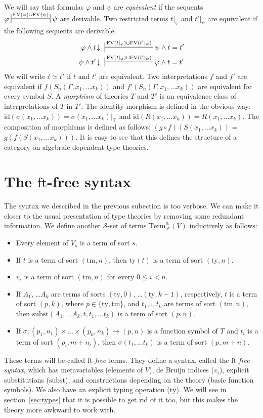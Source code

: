 \documentclass[reqno]{amsart}
\theoremstyle{definition}
\theoremstyle{remark}
\newcommand{\fs}[1]{\mathrm{#1}}
\newcommand{\Term}{\fs{Term}}
\newcommand{\FV}{\fs{FV}}
\newcommand{\subst}{\fs{subst}}
\newcommand{\ft}{\fs{ft}}
\newcommand{\ty}{\fs{ty}}
\newcommand{\tm}{\fs{tm}}
\newcommand{\id}{\fs{id}}
\numberwithin{figure}{section}
\begin{document}
We will say that formulas $\varphi$ and $\psi$ are \emph{equivalent} if the sequents $\varphi \ssststile{}{\FV(\varphi) \cup \FV(\psi)} \psi$ are derivable.
Two restricted terms $t|_\varphi$ and $t'|_\psi$ are equivalent if the following sequents are derivable:
\begin{align*}
\varphi \land t\!\downarrow\ & \sststile{}{\FV(t|_\varphi) \cup \FV(t'|_\psi)} \psi \land t = t' \\
\psi \land t'\!\downarrow\ & \sststile{}{\FV(t|_\varphi) \cup \FV(t'|_\psi)} \varphi \land t = t'
\end{align*}
We will write $t \simeq t'$ if $t$ and $t'$ are equivalent.
Two interpretations $f$ and $f'$ are equivalent if $f(S_n(\Gamma, x_1, \ldots x_k))$ and $f'(S_n(\Gamma, x_1, \ldots x_k))$ are equivalent for every symbol $S$.
A \emph{morphism} of theories $T$ and $T'$ is an equivalence class of interpretations of $T$ in $T'$.
The identity morphism is defined in the obvious way: $\id(\sigma(x_1, \ldots x_k)) = \sigma(x_1, \ldots x_k)|_\top$ and $\id(R(x_1, \ldots x_k)) = R(x_1, \ldots x_k)$.
The composition of morphisms is defined as follows: $(g \circ f)(S(x_1, \ldots x_k))$ = $g(f(S(x_1, \ldots x_k)))$.
It is easy to see that this defines the structure of a category on algebraic dependent type theories.

\section{The $\ft$-free syntax}
\label{sec:contexts}

The syntax we described in the previous subection is too verbose.
We can make it closer to the usual presentation of type theories by removing some redundant information.
We define another $\mathcal{S}$-set of terms $\Term^\ft_\mathcal{F}(V)$ inductively as follows:
\begin{itemize}
\item Every element of $V_s$ is a term of sort $s$.
\item If $t$ is a term of sort $(\tm,n)$, then $\ty(t)$ is a term of sort $(\ty,n)$.
\item $v_i$ is a term of sort $(\tm,n)$ for every $0 \leq i < n$.
\item If $A_1$, \ldots $A_k$ are terms of sorts $(\ty,0)$, \ldots $(\ty,k-1)$, respectively, $t$ is a term of sort $(p,k)$, where $p \in \{ \ty, \tm \}$, and $t_1, \ldots t_k$ are terms of sort $(\tm,n)$, then $\subst(A_1, \ldots A_k, t, t_1, \ldots t_k)$ is a term of sort $(p,n)$.
\item If $\sigma : (p_1,n_1) \times \ldots \times (p_k,n_k) \to (p,n)$ is a function symbol of $T$ and $t_i$ is a term of sort $(p_i,m+n_i)$, then $\sigma(t_1, \ldots t_k)$ is a term of sort $(p,m+n)$.
\end{itemize}
These terms will be called \emph{$\ft$-free} terms.
They define a syntax, called the \emph{$\ft$-free syntax}, which has metavariables (elements of $V$), de Bruijn indices ($v_i$), explicit substitutions ($\subst$), and constructions depending on the theory (basic function symbols).
We also have an explicit typing operation ($\ty$).
We will see in section~\ref{sec:types} that it is possible to get rid of it too, but this makes the theory more awkward to work with.
\end{document}

